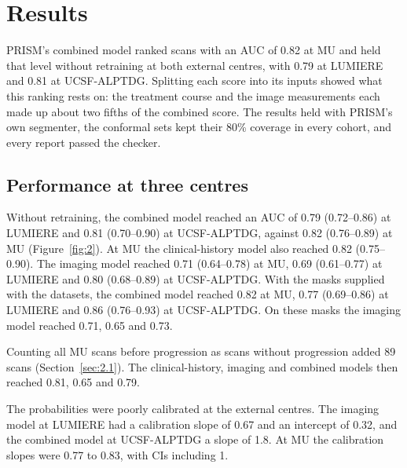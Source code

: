 \documentclass[largeformat]{interact} %
\begin{document}
\section{Results}\label{sec:3}

PRISM's combined model ranked scans with an AUC of 0.82 at MU and held that level without retraining at both
external centres, with 0.79 at LUMIERE and 0.81 at UCSF-ALPTDG. Splitting each score into its inputs showed what this
ranking rests on: the treatment course and the image measurements each made up about two fifths of the combined
score. The results held with PRISM's own segmenter, the conformal sets kept their 80\% coverage in every cohort, and
every report passed the checker.

\subsection{Performance at three centres}\label{sec:3.1}

Without retraining, the combined model reached an AUC of 0.79 (0.72--0.86) at LUMIERE and 0.81 (0.70--0.90) at
UCSF-ALPTDG, against 0.82 (0.76--0.89) at MU (Figure~\ref{fig:2}). At MU the clinical-history model also reached
0.82 (0.75--0.90). The imaging model reached 0.71 (0.64--0.78) at MU,
0.69 (0.61--0.77) at LUMIERE and 0.80 (0.68--0.89) at UCSF-ALPTDG. With the masks supplied with the datasets, the
combined model reached 0.82 at MU, 0.77 (0.69--0.86) at LUMIERE and 0.86 (0.76--0.93) at UCSF-ALPTDG. On these masks
the imaging model reached 0.71, 0.65 and 0.73.

Counting all MU scans before progression as scans without progression added 89 scans (Section~\ref{sec:2.1}). The
clinical-history, imaging and combined models then reached 0.81, 0.65 and 0.79.

The probabilities were poorly calibrated at the external centres. The imaging model at LUMIERE had a calibration
slope of 0.67 and an intercept of 0.32, and the combined model at UCSF-ALPTDG a slope of 1.8. At MU the calibration
slopes were 0.77 to 0.83, with CIs including 1.
\end{document}
